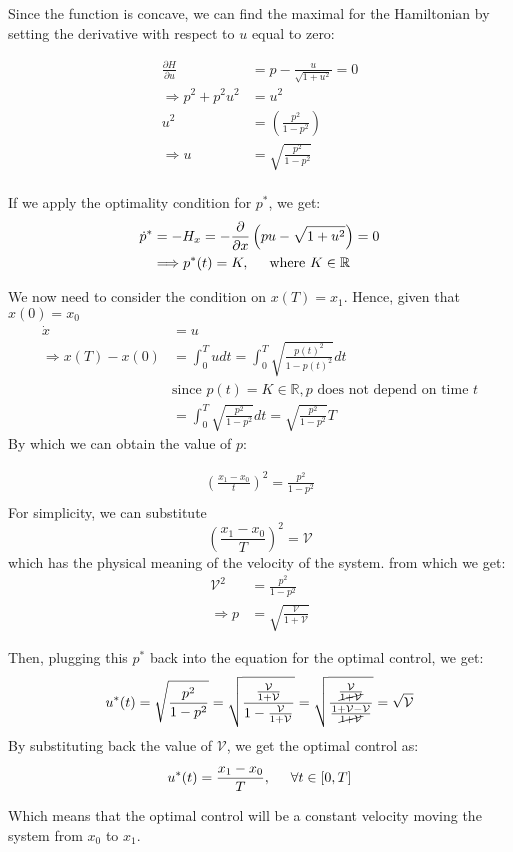 Since the function is concave, we can find the maximal for the Hamiltonian by setting the derivative with respect to $u$ equal to zero:

\begin{align}
    \frac{\partial H}{\partial u} &= p - \frac{u}{\sqrt{1+u^2}} = 0\\
    \Longrightarrow p^2 + p^2u^2 &= u^2\\
    u^2 &= \left( \frac{p^2}{1 - p^2} \right)\\
    \Longrightarrow u &= \sqrt{\frac{p^2}{1 - p^2}}\\
\end{align}

If we apply the optimality condition for $p^*$, we get:
\begin{align}
    \Dot{p}^* &= - H_x = - \frac{\partial}{\partial x} \left( pu - \sqrt{1+u^2} \right) = 0\\
    &\Longrightarrow p^*(t) = K, \hspace{0.5cm} \text{where } K \in \mathbb{R}
\end{align}

We now need to consider the condition on $x(T) = x_1$. Hence, given that $x(0) = x_0$
\begin{align}
    \Dot{x} &= u\\ 
    \Longrightarrow x(T) - x(0) &= \int_0^T u dt = \int_0^T \sqrt{\frac{p(t)^2}{1 - p(t)^2}} dt\\
    &\text{since } p(t) = K \in \mathbb{R}, \text{$p$ does not depend on time $t$}\\
    &= \int_0^T \sqrt{\frac{p^2}{1 - p^2}} dt = \sqrt{\frac{p^2}{1 - p^2}} T
\end{align}
By which we can obtain the value of $p$:

\begin{align}
    \left( \frac{x_1 - x_0}{t} \right)^2 = \frac{p^2}{1-p^2}\\
\end{align}
For simplicity, we can substitute 
\begin{equation}
    \left( \frac{x_1 - x_0}{T} \right)^2 =\mathcal{V}  
\end{equation}
which has the physical meaning of the velocity of the system. from which we get:
\begin{align}
    \mathcal{V}^2 &= \frac{p^2}{1 - p^2}\\
    \Longrightarrow p &= \sqrt{\frac{\mathcal{V}}{1+\mathcal{V}}}
\end{align}

Then, plugging this $p^*$ back into the equation for the optimal control, we get:
\begin{equation}
    u^*(t) = \sqrt{\frac{p^2}{1-p^2}} = \sqrt{\frac{\frac{\mathcal{V}}{1+\mathcal{V}}}{1 - \frac{\mathcal{V}}{1 + \mathcal{V}}}} = \sqrt{\frac{\frac{\mathcal{V}}{\cancel{1+\mathcal{V}}}}{\frac{1 + \mathcal{V}- \mathcal{V}}{\cancel{1+\mathcal{V}}}}} = \sqrt{\mathcal{V}}
\end{equation}
By substituting back the value of $\mathcal{V}$, we get the optimal control as:
\begin{equation}
    u^*(t) = \frac{x_1 - x_0}{T}, \hspace{0.5cm} \forall t \in [0, T]
\end{equation}

Which means that the optimal control will be a constant velocity moving the system from $x_0$ to $x_1$.